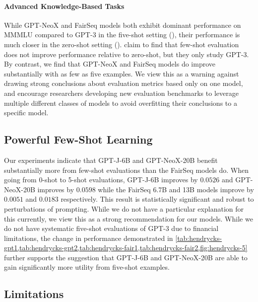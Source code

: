 \documentclass[11pt]{article}
\newcommand{\model}{GPT-NeoX-20B}
\begin{document}
\paragraph{Advanced Knowledge-Based Tasks} While GPT-NeoX and FairSeq models both exhibit dominant performance on MMMLU compared to GPT-3 in the five-shot setting (), their performance is much closer in the zero-shot setting (). \citet{hendrycks2021measuring} claim to find that few-shot evaluation does not improve performance relative to zero-shot, but they only study GPT-3. By contrast, we find that GPT-NeoX and FairSeq models do improve substantially with as few as five examples. We view this as a warning against drawing strong conclusions about evaluation metrics based only on one model, and encourage researchers developing new evaluation benchmarks to leverage multiple different classes of models to avoid overfitting their conclusions to a specific model.

\subsection{Powerful Few-Shot Learning}

Our experiments indicate that GPT-J-6B and \model{} benefit substantially more from few-shot evaluations than the FairSeq models do. When going from 0-shot to 5-shot evaluations, GPT-J-6B improves by $0.0526$ and \model{} improves by $0.0598$ while the FairSeq 6.7B and 13B models improve by $0.0051$ and $0.0183$ respectively. This result is statistically significant and robust to perturbations of prompting. While we do not have a particular explanation for this currently, we view this as a strong recommendation for our models. While we do not have systematic five-shot evaluations of GPT-3 due to financial limitations, the change in performance demonstrated in \cref{tab:hendrycks-gpt1,tab:hendrycks-gpt2,tab:hendrycks-fair1,tab:hendrycks-fair2,fig:hendrycks-5} further supports the suggestion that GPT-J-6B and GPT-NeoX-20B are able to gain significantly more utility from five-shot examples.

\subsection{Limitations}
\end{document}
